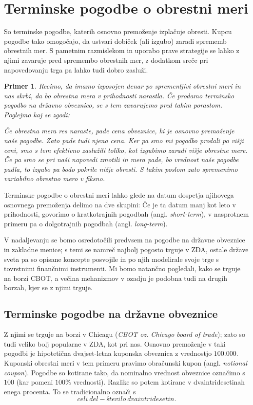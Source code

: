 \documentclass[a4paper, 11pt]{article}
\newtheorem{primer}{Primer}
\begin{document}
\section{Terminske pogodbe o obrestni meri}
So terminske pogodbe, katerih osnovno premoženje izplačuje obresti. Kupcu pogodbe tako omogočajo, da 
ustvari dobiček (ali izgubo) zaradi sprememb obrestnih mer. S pametnim razmislekom in uporabo prave 
strategije se lahko z njimi zavaruje pred spremembo obrestnih mer, z dodatkom sreče pri napovedovanju
trga pa lahko tudi dobro zasluži.

\begin{primer}
    Recimo, da imamo izposojen denar po spremenljivi obrestni meri in nas skrbi, da bo obrestna mera v 
    prihodnosti narastla. Če prodamo terminsko pogodbo na državno obveznico, se s tem zavarujemo pred 
    takim porastom. Poglejmo kaj se zgodi:

    Če obrestna mera res naraste, pade cena obveznice, ki je osnovno premoženje naše pogodbe. Zato pade
    tudi njena cena. Ker pa smo mi pogodbo prodali po višji ceni, smo s tem efektivno zaslužili toliko, 
    kot izgubimo zaradi višje obrestne mere. Če pa smo se pri naši napovedi zmotili in mera pade, bo 
    vrednost naše pogodbe padla, to izgubo pa bodo pokrile nižje obresti. S takim poslom zato spremenimo
    variabilno obrestno mero v fiksno. 
\end{primer}

Terminske pogodbe o obrestni meri lahko glede na datum dospetja njihovega osnovnega premoženja delimo na 
dve skupini: Če je ta datum manj kot leto v prihodnosti, govorimo o kratkotrajnih pogodbah (angl. 
\textit{short-term}), v nasprotnem primeru pa o dolgotrajnih pogodbah (angl. \textit{long-term}). 

V nadaljevanju se bomo osredotočili predvsem na pogodbe na državne obveznice in zakladne menice; s temi
se namreč najbolj pogosto trguje v ZDA, ostale države sveta pa so opisane koncepte posvojile in po njih
modelirale svoje trge s tovrstnimi finančnimi instrumenti. Mi bomo natančno pogledali, kako se trguje na
borzi CBOT, a večina mehanizmov v ozadju je podobna tudi na drugih borzah, kjer se z njimi trguje.

\subsection{Terminske pogodbe na državne obveznice}
Z njimi se trguje na borzi v Chicagu (\textit{CBOT oz. Chicago board of trade}); zato so tudi veliko 
bolj popularne v ZDA, kot pri nas. Osnovno premoženje v taki pogodbi je hipotetična dvajset-letna 
kuponska obveznica z vrednostjo \textdollar$100.000$. Kuponski obrestni meri v tem primeru pravimo 
obračunski kupon (angl. \textit{notional coupon}). Pogodbe so kotirane tako, da nominalno vrednost 
obveznice označimo s $100$ (kar pomeni $100\%$ vrednosti). Razlike so potem kotirane v dvaintridesetinah 
enega procenta. To se tradicionalno označi s 
%
$$ celi\:del - število\:dvaintridesetin. $$
%
\end{document}
